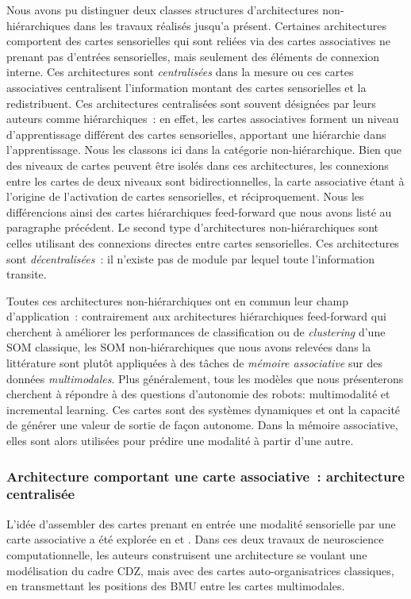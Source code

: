 \documentclass[../main]{subfiles}
\begin{document}
Nous avons pu distinguer deux classes structures d'architectures non-hiérarchiques dans les travaux réalisés jusqu'a présent.
Certaines architectures comportent des cartes sensorielles qui sont reliées via des cartes associatives ne prenant pas d'entrées sensorielles, mais seulement des éléments de connexion interne. Ces architectures sont \emph{centralisées} dans la mesure ou ces cartes associatives centralisent l'information  montant des cartes sensorielles et la redistribuent. Ces architectures centralisées sont souvent désignées par leurs auteurs comme hiérarchiques~: en effet, les cartes associatives forment un niveau d'apprentissage différent des cartes sensorielles, apportant une hiérarchie dans l'apprentissage. Nous les classons ici dans la catégorie non-hiérarchique. Bien que des niveaux de cartes peuvent être isolés dans ces architectures, les connexions entre les cartes de deux niveaux sont bidirectionnelles, la carte associative étant à l'origine de l'activation de cartes sensorielles, et réciproquement.
Nous les différencions ainsi des cartes hiérarchiques feed-forward que nous avons listé au paragraphe précédent.
Le second type d'architectures non-hiérarchiques sont celles utilisant des connexions directes entre cartes sensorielles. Ces architectures sont \emph{décentralisées}~: il n'existe pas de module par lequel toute l'information transite.

Toutes ces architectures non-hiérarchiques ont en commun leur champ d'application~: contrairement aux architectures hiérarchiques feed-forward qui cherchent à améliorer les performances de classification ou de \emph{clustering} d'une SOM classique, les SOM non-hiérarchiques que nous avons relevées dans la littérature sont plutôt appliquées à des tâches de \emph{mémoire associative} sur des données \emph{multimodales}. 
Plus généralement, tous les modèles que nous présenterons cherchent à répondre à des questions d'autonomie des robots: multimodalité et incremental learning. 
Ces cartes sont des systèmes dynamiques et ont la capacité de générer une valeur de sortie de façon autonome. Dans la mémoire associative, elles sont alors utilisées pour prédire une modalité à partir d'une autre.

\subsubsection{Architecture comportant une carte associative~: architecture centralisée}

L'idée d'assembler des cartes prenant en entrée une modalité sensorielle par une carte associative a été explorée en \cite{dominey13} et \cite{escobar-juarez_self-organized_2016}.
Dans ces deux travaux de neuroscience computationnelle, les auteurs construisent une architecture se voulant une modélisation du cadre CDZ, mais avec des cartes auto-organisatrices classiques, en transmettant les positions des BMU entre les cartes multimodales. 
\end{document}
